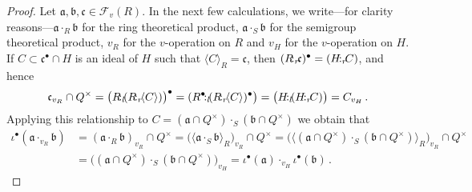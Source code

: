 \documentclass[a4paper]{amsart}
\theoremstyle{definition}
\numberwithin{equation}{section}
\begin{document}
\begin{proof}
Let $\mathfrak a, \mathfrak b, \mathfrak c \in \mathcal F_v (R)$. In
the next few calculations, we write---for clarity
reasons---$\mathfrak a \cdot_R \mathfrak b$ for the ring theoretical
product, $\mathfrak a \cdot_S \mathfrak b$ for the semigroup
theoretical product, $v_R$ for the $v$-operation on $R$ and $v_H$
for the $v$-operation on $H$. If $C \subset \mathfrak c^{\bullet}
\cap H$ is an ideal of $H$ such that $\langle C \rangle_R =
\mathfrak c$, then $(R {\negthinspace :_r \negthinspace} \mathfrak c)^{\bullet} = (H {\negthinspace :_r \negthinspace} C)$,
and hence
\[
\mathfrak c_{v_R} \cap Q^{\times} = \big( R {\negthinspace :_l \negthinspace} (R {\negthinspace :_r \negthinspace} \langle C
\rangle) \big)^{\bullet} = (R^{\bullet} {\negthinspace :_l \negthinspace} (R {\negthinspace :_r \negthinspace} \langle C
\rangle)^{\bullet} \big) = \big( H {\negthinspace :_l \negthinspace} (H {\negthinspace :_r \negthinspace} C) \big) = C_{v_H}
\,.
\]
Applying this relationship to $C = (\mathfrak a \cap
Q^{\times})\cdot_S(\mathfrak b \cap Q^{\times})$ we obtain that
\[
\begin{aligned}
\iota^{\bullet} ( \mathfrak a \cdot_{v_R} \mathfrak b) & = (
\mathfrak a \cdot_R \mathfrak b)_{v_R} \cap Q^{\times}  = \big(
\langle \mathfrak a \cdot_S \mathfrak b \rangle_R \big)_{v_R} \cap
Q^{\times}  = \big( \langle (\mathfrak a \cap Q^{\times}) \cdot_S
(\mathfrak b \cap
Q^{\times}) \rangle_R \big)_{v_R} \cap Q^{\times} \\
& = \big( (\mathfrak a \cap Q^{\times})\cdot_S(\mathfrak b \cap
Q^{\times}) \big)_{v_H}  = \iota^{\bullet}(\mathfrak a) \cdot_{v_H}
\iota^{\bullet} (\mathfrak b) \,.
\end{aligned}
\]


\end{proof}
\end{document}
